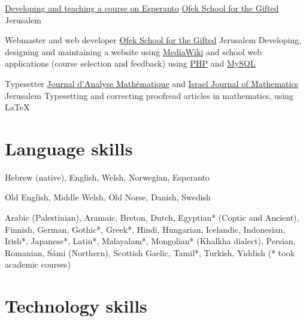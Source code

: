 	{\href{https://xpr.digitalwords.net/katalogo/esperanto/}{Developing and teaching a course on Esperanto}}
	{\href{https://facebook.com/ofekschooljerusalem/}{Ofek School for the Gifted}}
	{Jerusalem}
	{}
	{}

	{Webmaster and web developer}
	{\href{https://facebook.com/ofekschooljerusalem/}{Ofek School for the Gifted}}
	{Jerusalem}
	{}
	{Developing, designing and maintaining a website using \href{https://mediawiki.org/}{MediaWiki} and school web applications (course selection and feedback) using \href{https://php.net/}{PHP} and \href{https://mysql.com/}{MySQL}}

	{Typesetter}
	{\href{https://ma.huji.ac.il/~w-jam/}{Journal d’Analyse Mathématique} and \href{https://ma.huji.ac.il/~ijmath/}{Israel Journal of Mathematics}}
	{Jerusalem}
	{}
	{Typesetting and correcting proofread articles in mathematics, using {\texfont\LaTeX}}



\section{Language skills}

	{Hebrew (native), English, Welsh, Norwegian, Esperanto}


	{Old English, Middle Welsh, Old Norse, Danish, Swedish}

	{%
		Arabic (Palestinian),
		Aramaic,
		Breton,
		Dutch,
		Egyptian* (Coptic and Ancient),
		Finnish,
		German,
		Gothic*,
		Greek*,
		Hindi,
		Hungarian,
		Icelandic,
		Indonesian,
		Irish*,
		Japanese*,
		Latin*,
		Malayalam*,
		Mongolian* (Khalkha dialect),
		Persian,
		Romanian,
		Sámi (Northern),
		Scottish Gaelic,
		Tamil*,
		Turkish,
		Yiddish
		\hfill{}{\normalfont\small (* took academic courses)}
	}



\section{Technology skills}


